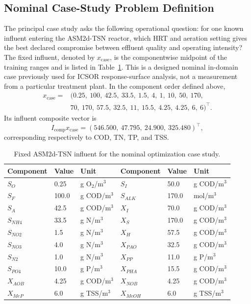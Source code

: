 \documentclass[a4paper,fleqn]{cas-sc}
\begin{document}
\subsection{Nominal Case-Study Problem Definition}

The principal case study asks the following operational question: for one known influent entering the ASM2d-TSN reactor, which HRT and aeration setting gives the best declared compromise between effluent quality and operating intensity? The fixed influent, denoted by $x_{\mathrm{case}}$, is the componentwise midpoint of the training ranges and is listed in Table~\ref{tab:case_study_influent}. This is a designed nominal in-domain case previously used for ICSOR response-surface analysis, not a measurement from a particular treatment plant. In the component order defined above,
\begin{equation}
\label{eq:case_influent_vector}
\begin{split}
x_{\mathrm{case}}={}&(0.25,\ 100,\ 42.5,\ 33.5,\ 1.5,\ 4,\ 1,\ 10,\ 50,\ 170,\\
&70,\ 170,\ 57.5,\ 32.5,\ 11,\ 15.5,\ 4.25,\ 4.25,\ 6,\ 6)^\top.
\end{split}
\end{equation}
Its influent composite vector is
\begin{equation}
\label{eq:case_influent_composites}
I_{\mathrm{comp}}x_{\mathrm{case}}
=(546.500,\ 47.795,\ 24.900,\ 325.480)^\top,
\end{equation}
corresponding respectively to COD, TN, TP, and TSS.

\begin{table}[htbp]
\centering
\caption{Fixed ASM2d-TSN influent for the nominal optimization case study.}
\label{tab:case_study_influent}
\scriptsize
\setlength{\tabcolsep}{3pt}
\begin{tabular}{lll|lll}
\toprule
Component & Value & Unit & Component & Value & Unit \\
\midrule
$S_O$ & 0.25 & g O$_2$/m$^3$ & $S_I$ & 50.0 & g COD/m$^3$ \\
$S_F$ & 100.0 & g COD/m$^3$ & $S_{ALK}$ & 170.0 & mol/m$^3$ \\
$S_A$ & 42.5 & g COD/m$^3$ & $X_I$ & 70.0 & g COD/m$^3$ \\
$S_{NH4}$ & 33.5 & g N/m$^3$ & $X_S$ & 170.0 & g COD/m$^3$ \\
$S_{NO2}$ & 1.5 & g N/m$^3$ & $X_H$ & 57.5 & g COD/m$^3$ \\
$S_{NO3}$ & 4.0 & g N/m$^3$ & $X_{PAO}$ & 32.5 & g COD/m$^3$ \\
$S_{N2}$ & 1.0 & g N/m$^3$ & $X_{PP}$ & 11.0 & g P/m$^3$ \\
$S_{PO4}$ & 10.0 & g P/m$^3$ & $X_{PHA}$ & 15.5 & g COD/m$^3$ \\
$X_{AOB}$ & 4.25 & g COD/m$^3$ & $X_{NOB}$ & 4.25 & g COD/m$^3$ \\
$X_{MeP}$ & 6.0 & g TSS/m$^3$ & $X_{MeOH}$ & 6.0 & g TSS/m$^3$ \\
\bottomrule
\end{tabular}
\end{table}
\end{document}
